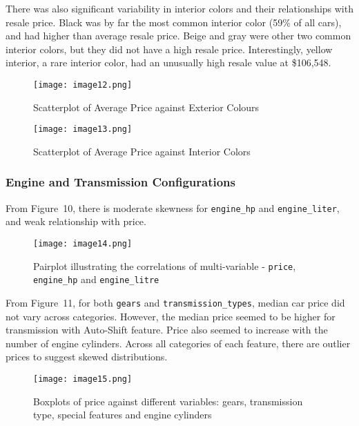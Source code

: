 \documentclass{article}
\begin{document}
There was also significant variability in interior colors and their relationships with resale price. Black was by far the most common interior color (59\% of all cars), and had higher than average resale price. Beige and gray were other two common interior colors, but they did not have a high resale price. Interestingly, yellow interior, a rare interior color, had an unusually high resale value at \$106,548.

\begin{figure}[H]
   \centering
   \texttt{[image: image12.png]}  %
   \caption{Scatterplot of Average Price against Exterior Colours}
   \label{fig:brand_dist}
\end{figure}

\begin{figure}[H]
   \centering
   \texttt{[image: image13.png]}  %
   \caption{Scatterplot of Average Price against Interior Colors}
   \label{fig:brand_dist}
\end{figure}

\subsubsection{Engine and Transmission Configurations}

From Figure~10, there is moderate skewness for \texttt{engine\_hp} and \texttt{engine\_liter}, and weak relationship with price.

\begin{figure}[H]
   \centering
   \texttt{[image: image14.png]}  %
   \caption{Pairplot illustrating the correlations of multi-variable - \texttt{price}, \texttt{engine\_hp} and \texttt{engine\_litre}}
   \label{fig:brand_dist}
\end{figure}

\newpage
From Figure~11, for both \texttt{gears} and \texttt{transmission\_types}, median car price did not vary across categories. However, the median price seemed to be higher for transmission with Auto-Shift feature. Price also seemed to increase with the number of engine cylinders. Across all categories of each feature, there are outlier prices to suggest skewed distributions.

\begin{figure}[H]
   \centering
   \texttt{[image: image15.png]}  %
   \caption{Boxplots of price against different variables: gears, transmission type, special features and engine cylinders}
   \label{fig:brand_dist}
\end{figure}
\end{document}
